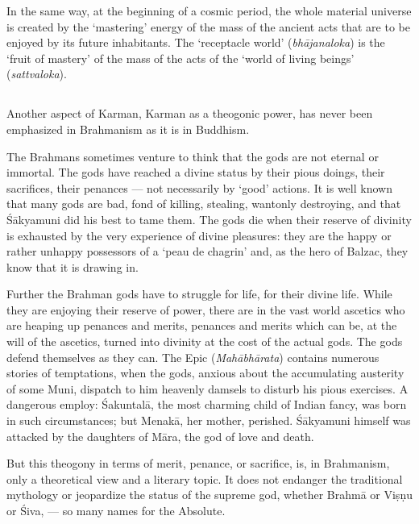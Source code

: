 \documentclass[a4paper, 11pt, oneside, english, landscape]{article}
\begin{document}
In the same way, at the beginning of a cosmic period, the whole material universe is created by the `mastering' energy of the mass of the ancient acts that are to be enjoyed by its future inhabitants. The `receptacle world' (\emph{bhājanaloka}) is the `fruit of mastery' of the mass of the acts of the `world of living beings' (\emph{sattvaloka}).

\subsection{}
\paragraph{}
Another aspect of Karman, Karman as a theogonic power, has never been emphasized in Brahmanism as it is in Buddhism.

The Brahmans sometimes venture to think that the gods are not eternal or immortal. The gods have reached a divine status by their pious doings, their sacrifices, their penances --- not necessarily by `good' actions. It is well known that many gods are bad, fond of killing, stealing, wantonly destroying, and that Śākyamuni did his best to tame them. The gods die when their reserve of divinity is exhausted by the very experience of divine pleasures: they are the happy or rather unhappy possessors of a `peau de chagrin' and, as the hero of Balzac, they know that it is drawing in.

Further the Brahman gods have to struggle for life, for their divine life. While they are enjoying their reserve of power, there are in the vast world ascetics who are heaping up penances and merits, penances and merits which can be, at the will of the ascetics, turned into divinity at the cost of the actual gods. The gods defend themselves as they can. The Epic (\emph{Mahābhārata}) contains numerous stories of temptations, when the gods, anxious about the accumulating austerity of some Muni, dispatch to him heavenly damsels to disturb his pious exercises. A dangerous employ: Śakuntalā, the most charming child of Indian fancy, was born in such circumstances; but Menakā, her mother, perished. Śākyamuni himself was attacked by the daughters of Māra, the god of love and death.

But this theogony in terms of merit, penance, or sacrifice, is, in Brahmanism, only a theoretical view and a literary topic. It does not endanger the traditional mythology or jeopardize the status of the supreme god, whether Brahmā or Viṣṇu or Śiva, --- so many names for the Absolute.
\end{document}
